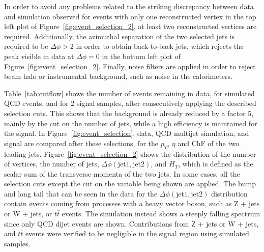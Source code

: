 In order to avoid any problems related to the striking discrepancy between data and simulation observed for events with only one reconstructed vertex in the top left plot of Figure~\ref{fig:event_selection_2}, at least two reconstructed vertices are required. Additionally, the azimuthal separation of the two selected jets is required to be $\Delta\phi > 2$ in order to obtain back-to-back jets, which rejects the peak visible in data at $\Delta\phi = 0$ in the bottom left plot of Figure~\ref{fig:event_selection_2}. Finally, noise filters are applied in order to reject beam halo or instrumental background, such as noise in the calorimeters.

Table~\ref{tab:cutflow} shows the number of events remaining in data, for simulated \ac{QCD} events, and for 2 signal samples, after consecutively applying the described selection cuts. This shows that the background is already reduced by a factor 5, mainly by the cut on the number of jets, while a high efficiency is maintained for the signal. In Figure~\ref{fig:event_selection}, data, \ac{QCD} multijet simulation, and signal are compared after these selections, for the $p_T$, $\eta$ and ChF of the two leading jets. Figure~\ref{fig:event_selection_2} shows the distribution of the number of vertices, the number of jets, $\Delta\phi(\mathrm{jet}1, \mathrm{jet}2)$, and $H_{T}$, which is defined as the scalar sum of the transverse momenta of the two jets. In some cases, all the selection cuts except the cut on the variable being shown are applied. The bump and long tail that can be seen in the data for the $\Delta\phi(\mathrm{jet}1, \mathrm{jet}2)$ distribution contain events coming from processes with a heavy vector boson, such as Z + jets or W + jets, or $t\bar{t}$ events. The simulation instead shows a steeply falling spectrum since only \ac{QCD} dijet events are shown. Contributions from Z + jets or W + jets, and $t\bar{t}$ events were verified to be negligible in the signal region using simulated samples.

